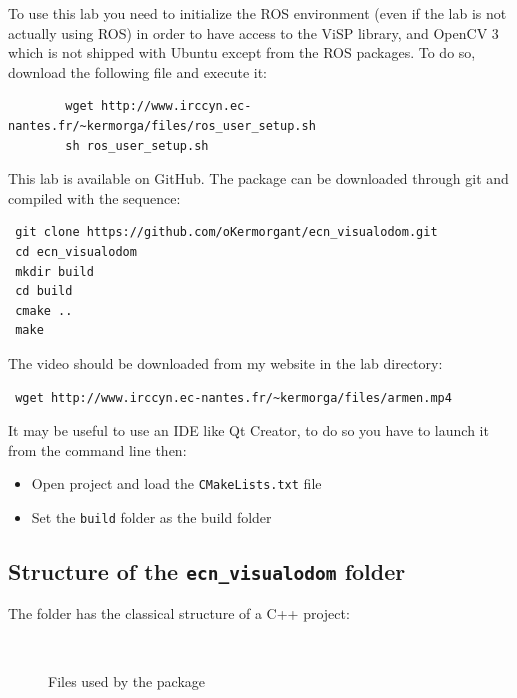 \documentclass{ecnreport}
\begin{document}
To use this lab you need to initialize the ROS environment (even if the lab is not actually using ROS) in order to have access to the ViSP library, and OpenCV 3 which is not shipped with Ubuntu except from the ROS packages.
To do so, download the following file and execute it:
\begin{center}\cppstyle
\begin{lstlisting}
        wget http://www.irccyn.ec-nantes.fr/~kermorga/files/ros_user_setup.sh
        sh ros_user_setup.sh
\end{lstlisting}
\end{center}

This lab is available on GitHub. The package can be downloaded through git and compiled with the sequence:
\begin{center}\cppstyle
\begin{lstlisting}
 git clone https://github.com/oKermorgant/ecn_visualodom.git
 cd ecn_visualodom
 mkdir build
 cd build
 cmake ..
 make
\end{lstlisting}
\end{center} 

The video should be downloaded from my website in the lab directory:
\begin{center}\cppstyle
\begin{lstlisting}
 wget http://www.irccyn.ec-nantes.fr/~kermorga/files/armen.mp4
\end{lstlisting}
\end{center} 

It may be useful to use an IDE like Qt Creator, to do so you have to launch it from the command line then:
\begin{itemize}
 \item Open project and load the \texttt{CMakeLists.txt} file
 \item Set the \texttt{build} folder as the build folder
\end{itemize}
 

\subsection{Structure of the \texttt{ecn\_visualodom} folder}

The folder has the classical structure of a C++ project:
\begin{figure}[h]\centering
\begin{minipage}{.05\linewidth} ~ \end{minipage}
\begin{minipage}{.75\linewidth}
\end{minipage}
\caption{Files used by the package}
\end{figure}
\end{document}
